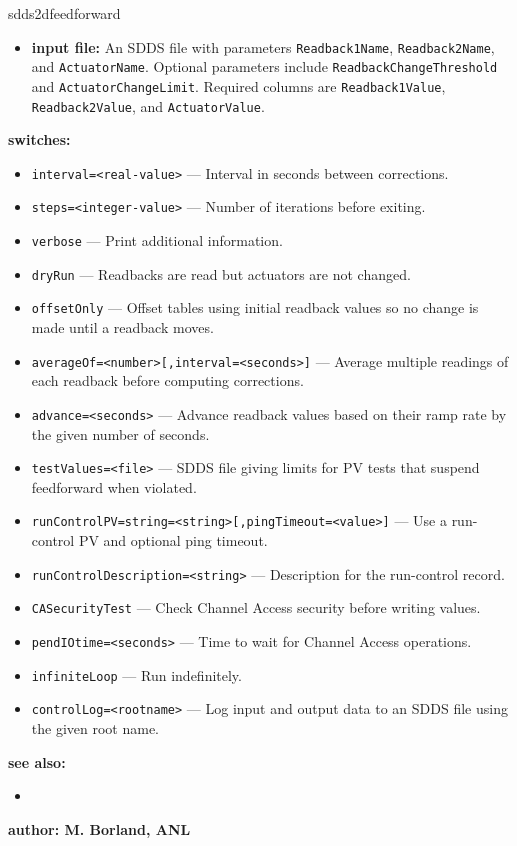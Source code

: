 \begin{sddsprog}{sdds2dfeedforward}
\begin{itemize}
  \item {\bf input file:} An SDDS file with parameters \verb+Readback1Name+,
  \verb+Readback2Name+, and \verb+ActuatorName+.  Optional parameters include
  \verb+ReadbackChangeThreshold+ and \verb+ActuatorChangeLimit+.  Required
  columns are \verb+Readback1Value+, \verb+Readback2Value+, and
  \verb+ActuatorValue+.
\end{itemize}
\item {\bf switches:}
    \begin{itemize}
        \item {\tt interval=<real-value>} --- Interval in seconds between corrections.
        \item {\tt steps=<integer-value>} --- Number of iterations before exiting.
        \item {\tt verbose} --- Print additional information.
        \item {\tt dryRun} --- Readbacks are read but actuators are not changed.
        \item {\tt offsetOnly} --- Offset tables using initial readback values so
               no change is made until a readback moves.
        \item {\tt averageOf=<number>[,interval=<seconds>]} --- Average multiple
               readings of each readback before computing corrections.
        \item {\tt advance=<seconds>} --- Advance readback values based on their
               ramp rate by the given number of seconds.
        \item {\tt testValues=<file>} --- SDDS file giving limits for PV tests that
               suspend feedforward when violated.
        \item {\tt runControlPV=string=<string>[,pingTimeout=<value>]} --- Use a
               run-control PV and optional ping timeout.
        \item {\tt runControlDescription=<string>} --- Description for the
               run-control record.
        \item {\tt CASecurityTest} --- Check Channel Access security before
               writing values.
        \item {\tt pendIOtime=<seconds>} --- Time to wait for Channel Access
               operations.
        \item {\tt infiniteLoop} --- Run indefinitely.
        \item {\tt controlLog=<rootname>} --- Log input and output data to an
               SDDS file using the given root name.
    \end{itemize}
\item {\bf see also:}
  \begin{itemize}
    \item {}
  \end{itemize}
\item {\bf author: M. Borland, ANL}
\end{sddsprog}
